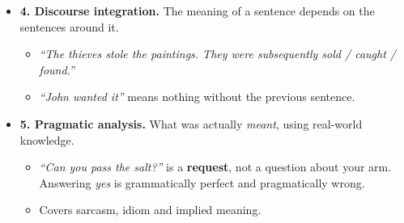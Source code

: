 {\begin{itemize}
  \item \textbf{4. Discourse integration.} The meaning of a sentence depends on the
        sentences around it.
  \begin{itemize}
    \item \emph{``The thieves stole the paintings. They were subsequently sold /
          caught / found.''} 
    \item \emph{``John wanted it''} means nothing without the previous sentence.
  \end{itemize}
  \item \textbf{5. Pragmatic analysis.} What was actually \emph{meant}, using real-world
        knowledge.
  \begin{itemize}
    \item \emph{``Can you pass the salt?''} is a \textbf{request}, not a question about
          your arm. Answering \emph{yes} is grammatically perfect and pragmatically
          wrong.
    \item Covers sarcasm, idiom and implied meaning.
  \end{itemize}
\end{itemize}}

